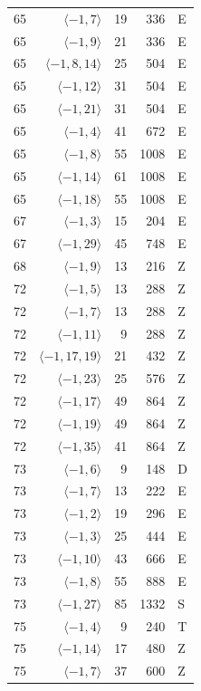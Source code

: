 \begin{longtable}{rrrrl}
65 & $\langle -1, 7\rangle$ & 19 & 336 & E \\
65 & $\langle -1, 9\rangle$ & 21 & 336 & E \\
65 & $\langle -1, 8, 14\rangle$ & 25 & 504 & E \\
65 & $\langle -1, 12\rangle$ & 31 & 504 & E \\
65 & $\langle -1, 21\rangle$ & 31 & 504 & E \\
65 & $\langle -1, 4\rangle$ & 41 & 672 & E \\
65 & $\langle -1, 8\rangle$ & 55 & 1008 & E \\
65 & $\langle -1, 14\rangle$ & 61 & 1008 & E \\
65 & $\langle -1, 18\rangle$ & 55 & 1008 & E \\
67 & $\langle -1, 3\rangle$ & 15 & 204 & E \\
67 & $\langle -1, 29\rangle$ & 45 & 748 & E \\
68 & $\langle -1, 9\rangle$ & 13 & 216 & Z \\
72 & $\langle -1, 5\rangle$ & 13 & 288 & Z \\
72 & $\langle -1, 7\rangle$ & 13 & 288 & Z \\
72 & $\langle -1, 11\rangle$ & 9 & 288 & Z \\
72 & $\langle -1, 17, 19\rangle$ & 21 & 432 & Z \\
72 & $\langle -1, 23\rangle$ & 25 & 576 & Z \\
72 & $\langle -1, 17\rangle$ & 49 & 864 & Z \\
72 & $\langle -1, 19\rangle$ & 49 & 864 & Z \\
72 & $\langle -1, 35\rangle$ & 41 & 864 & Z \\
73 & $\langle -1, 6\rangle$ & 9 & 148 & D \\
73 & $\langle -1, 7\rangle$ & 13 & 222 & E \\
73 & $\langle -1, 2\rangle$ & 19 & 296 & E \\
73 & $\langle -1, 3\rangle$ & 25 & 444 & E \\
73 & $\langle -1, 10\rangle$ & 43 & 666 & E \\
73 & $\langle -1, 8\rangle$ & 55 & 888 & E \\
73 & $\langle -1, 27\rangle$ & 85 & 1332 & S \\
75 & $\langle -1, 4\rangle$ & 9 & 240 & T \\
75 & $\langle -1, 14\rangle$ & 17 & 480 & Z \\
75 & $\langle -1, 7\rangle$ & 37 & 600 & Z \\

\end{longtable}
